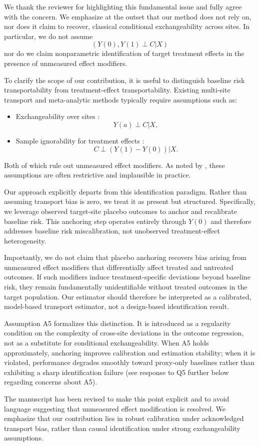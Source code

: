 {\color{blue}We thank the reviewer for highlighting this fundamental issue and fully agree with the concern. We emphasize at the outset that our method does not rely on, nor does it claim to recover, classical conditional exchangeability across sites. In particular, we do not assume 
\[
(Y(0),Y(1)\perp C | X)
\]
nor do we claim nonparametric identification of target treatment effects in the presence of unmeasured effect modifiers.

To clarify the scope of our contribution, it is useful to distinguish baseline risk transportability from treatment-effect transportability. Existing multi-site transport and meta-analytic methods typically require assumptions such as:
\begin{itemize} 
\item Exchangeability over sites \citep{dahabreh2023efficient}: $$Y(a)\perp C | X,$$
\item Sample ignorability for treatment effects 
\citep{hong2025estimating}: $$C \perp (Y(1)-Y(0)) | X.$$ 
\end{itemize}
Both of which rule out unmeasured effect modifiers. As noted by \cite{rott2025causally}, these assumptions are often restrictive and implausible in practice.

Our approach explicitly departs from this identification paradigm. Rather than assuming transport bias is zero, we treat it as present but structured. Specifically, we leverage observed target-site placebo outcomes to anchor and recalibrate baseline risk. This anchoring step operates entirely through $Y(0)$ and therefore addresses baseline risk miscalibration, not unobserved treatment-effect heterogeneity.

Importantly, we do not claim that placebo anchoring recovers bias arising from unmeasured effect modifiers that differentially affect treated and untreated outcomes. If such modifiers induce treatment-specific deviations beyond baseline risk, they remain fundamentally unidentifiable without treated outcomes in the target population. Our estimator should therefore be interpreted as a calibrated, model-based transport estimator, not a design-based identification result.

Assumption A5 formalizes this distinction. It is introduced as a regularity condition on the complexity of cross-site deviations in the outcome regression, not as a substitute for conditional exchangeability. When A5 holds approximately, anchoring improves calibration and estimation stability; when it is violated, performance degrades smoothly toward proxy-only baselines rather than exhibiting a sharp identification failure (see response to Q5 further below regarding concerns about A5).

The manuscript has been revised to make this point explicit and to avoid language suggesting that unmeasured effect modification is resolved. We emphasize that our contribution lies in robust calibration under acknowledged transport bias, rather than causal identification under strong exchangeability assumptions.}


